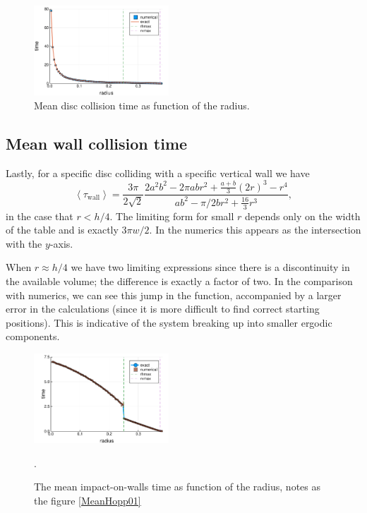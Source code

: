 \documentclass[superscriptaddress,pre,reprint,showpacs,twocolumn]{revtex4-1}
\newcommand{\mean}[1]{\left \langle #1 \right \rangle}
\begin{document}
\begin{figure}[h]
  \centering
  \includegraphics[width=0.45\textwidth]{figures/DiscCollisions01.pdf}
  \caption{Mean disc collision time as function of the radius. }\label{MeanCol01}
\end{figure}



\subsection{Mean wall collision time}

Lastly, for a specific disc colliding with a specific vertical wall we have
\begin{equation}\label{impactwall}
 \mean{\tau_\text{wall}} = 	
\frac{3 \pi}{2\sqrt{2}}
\frac { 2a^{2} b^{2}  -  2\pi a b r^{2} + \frac{a+b}{3}(2r)^3 - r^4}
{ab^2-\pi/2b r^2 + \frac{16}{3} r^3 },
\end{equation}
in the case that $r<h/4$. The limiting form for small $r$ depends
only on the width of the table and is exactly
$3\pi w/2$. In the numerics this appears as the intersection with the
$y$-axis. %

When $r\approx h/4$ we have two limiting expressions
since there is a discontinuity in the available volume; the difference is exactly
a factor of two. In the comparison with numerics, we can see
this jump in the function, accompanied by a larger error in the
calculations (since it is more difficult to find correct starting positions). 
This is indicative of 
the system breaking up into smaller ergodic components.


\begin{figure}[h]
  \centering
  \includegraphics[width=0.45\textwidth]{./figures/HitRightWall01.pdf}
  \caption{The mean impact-on-walls time as function of the radius, 
    notes as the figure \ref{MeanHopp01}}
    \label{MeanImp01}.
\end{figure}
\end{document}

